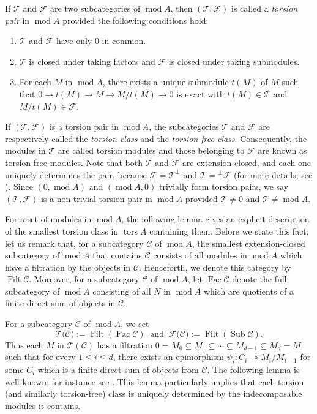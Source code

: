 \documentclass{amsart}
\theoremstyle{thmstyle}
\theoremstyle{exstyle}
\theoremstyle{defstyle}
\theoremstyle{remstyle}
\theoremstyle{remstyle}
\newcommand{\Fac}{\operatorname{Fac}}
\DeclareMathOperator*{\modu}{mod}
\DeclareMathOperator*{\Sub}{Sub}
\DeclareMathOperator*{\Filt}{Filt}
\DeclareMathOperator*{\tors}{tors}
\begin{document}
If $\mathcal{T}$ and $\mathcal{F}$ are two subcategories of $\modu A$, then $(\mathcal{T},\mathcal{F})$ is called a \emph{torsion pair} in $\modu A$ provided the following conditions hold:
\begin{enumerate}
    \item $\mathcal{T}$ and $\mathcal{F}$ have only $0$ in common.
    \item $\mathcal{T}$ is closed under taking factors and $\mathcal{F}$ is closed under taking submodules.
    \item For each $M$ in $\modu A$, there exists a unique submodule $t(M)$ of $M$ such that $0 \rightarrow t(M) \rightarrow M \rightarrow M/t(M)\rightarrow 0$ is exact with $t(M) \in \mathcal{T}$ and $M/t(M) \in \mathcal{F}$.
\end{enumerate}

If $(\mathcal{T},\mathcal{F})$ is a torsion pair in $\modu A$, the subcategories $\mathcal{T}$ and $\mathcal{F}$ are respectively called the \emph{torsion class} and the \emph{torsion-free class}. Consequently, the modules in $\mathcal{T}$ are called torsion modules and those belonging to $\mathcal{F}$ are known as torsion-free modules. Note that  both $\mathcal{T}$ and $\mathcal{F}$ are extension-closed, and each one uniquely determines the pair, because $\mathcal{F}=\mathcal{T}^\perp$ and $\mathcal{T}= {}^\perp\mathcal{F}$ (for more details, see \cite[Chapter VI.1]{ASS}). 
Since $(0,\modu A)$ and $(\modu A, 0)$ trivially form torsion pairs, we say $(\mathcal{T},\mathcal{F})$ is a non-trivial torsion pair in $\modu A$  provided $\mathcal{T}\neq 0$ and $\mathcal{T}\neq \modu A$. 

For a set of modules in $\modu A$, the following lemma gives an explicit description of the smallest torsion class in $\tors A$ containing them. Before we state this fact, let us remark that, for a subcategory $\mathcal{C}$ of $\modu A$, the smallest extension-closed subcategory of $\modu A$ that contains $\mathcal{C}$ consists of all modules in $\modu A$ which have a filtration by the objects in $\mathcal{C}$. Henceforth, we denote this category by $\Filt\mathcal{C}$. Moreover, for a subcategory $\mathcal{C}$ of $\modu A$, let $\Fac\mathcal{C}$ denote the full subcategory of $\modu A$ consisting of all $N$ in $\modu A$ which are quotients of a finite direct sum of objects in $\mathcal{C}$.

For a subcategory $\mathcal{C}$ of $\modu A$, we set 
$$\mathcal{T(\mathcal{C}}):=\Filt(\Fac\mathcal{C})\ \mbox{ and }\ 
\mathcal{F(\mathcal{C}}):=\Filt(\Sub\mathcal{C}).$$
 Thus each $M$ in $\mathcal{T}(\mathcal{C})$ has a filtration $0= M_0 \subseteq M_1 \subseteq \cdots \subseteq M_{d-1} \subseteq M_d=M$ such that for every $1 \leq i \leq d$, there exists an epimorphism $\psi_i:C_i\twoheadrightarrow M_{i}/M_{i-1}$ for some $C_i$ which is a finite direct sum of objects from $\mathcal{C}$. The following lemma is well known; for instance see \cite[Lemma 3.1]{MS}. This lemma particularly implies that each torsion (and similarly torsion-free) class is uniquely determined by the indecomposable modules it contains.
 
\end{document}
